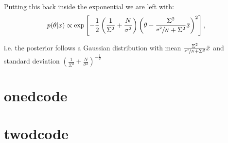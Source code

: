 \documentclass[a4paper,11pt,twoside]{article}
\begin{document}
Putting this back inside the exponential we are left with:
\begin{equation*}
	p(\theta|x) \propto \exp \left[ -\frac{1}{2} \left( \frac{1}{\Sigma^2} + \frac{N}{\sigma^2} \right) \left( \theta - \frac{\Sigma^2}{\sfrac{\sigma^2}{N} + \Sigma^2} \bar{x} \right)^2 \right],
\end{equation*}

i.e. the posterior follows a Gaussian distribution with mean $\frac{\Sigma^2}{\sfrac{\sigma^2}{N} + \Sigma^2} \bar{x}$ and standard deviation $\left( \frac{1}{\Sigma^2} + \frac{N}{\sigma^2} \right)^{-\frac{1}{2}}$  

\section{onedcode} 
\label{sec:onedcode}

\section{twodcode}
\label{sec:twodcode}

\begin{thebibliography}{10}


\end{thebibliography}
\end{document}
